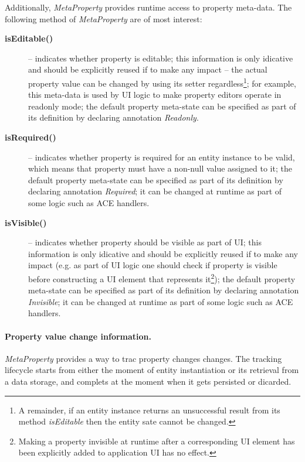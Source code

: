   Additionally, \emph{MetaProperty} provides runtime access to property meta-data.
  The following method of \emph{MetaProperty} are of most interest:
  \begin{description}
    \item[\textbf{isEditable()}] -- indicates whether property is editable; this information is only idicative and should be explicitly reused if to make any impact -- the actual property value can be changed by using its setter regardless\footnote{A remainder, if an entity instance returns an unsuccessful result from its method \emph{isEditable} then the entity sate cannot be changed.}; for example, this meta-data is used by UI logic to make property editors operate in readonly mode; the default property meta-state can be specified as part of its definition by declaring annotation \emph{Readonly}.
    \item[\textbf{isRequired()}] -- indicates whether property is required for an entity instance to be valid, which means that property must have a non-null value assigned to it; the default property meta-state can be specified as part of its definition by declaring annotation \emph{Required}; it can be changed at runtime as part of some logic such as ACE handlers.
    \item[\textbf{isVisible()}] -- indicates whether property should be visible as part of UI; this information is only idicative and should be explicitly reused if to make any impact (e.g. as part of UI logic one should check if property is visible before constructing a UI element that represents it\footnote{Making a property invisible at runtime after a corresponding UI element has been explicitly added to application UI has no effect.}); the default property meta-state can be specified as part of its definition by declaring annotation \emph{Invisible}; it can be changed at runtime as part of some logic such as ACE handlers.
  \end{description}  


  \paragraph*{Property value change information.}
  
  \emph{MetaProperty} provides a way to trac property changes changes.
  The tracking lifecycle starts from either the moment of entity instantiation or its retrieval from a data storage, and complets at the moment when it gets persisted or dicarded.

